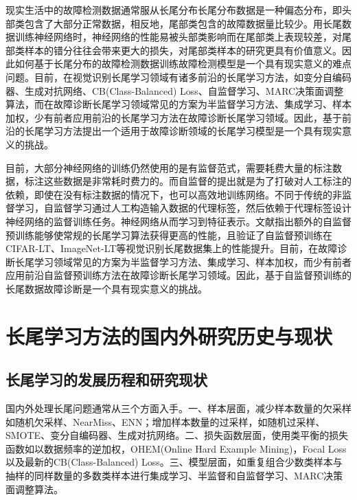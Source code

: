 \documentclass[master]{thesis-uestc}
\begin{document}
现实生活中的故障检测数据通常服从长尾分布长尾分布数据是一种偏态分布，即头部类包含了大部分正常数据，相反地，尾部类包含的故障数据量比较少。用长尾数据训练神经网络时，神经网络的性能易被头部类影响而在尾部类上表现较差，对尾部类样本的错分往往会带来更大的损失，对尾部类样本的研究更具有价值意义。因此如何基于长尾分布的故障检测数据训练故障检测模型是一个具有现实意义的难点问题。目前，在视觉识别长尾学习领域有诸多前沿的长尾学习方法，如变分自编码器、生成对抗网络、CB(Class-Balanced) Loss、自监督学习、MARC决策面调整算法，而在故障诊断长尾学习领域常见的方案为半监督学习方法、集成学习、样本加权，少有前者应用前沿的长尾学习方法在故障诊断长尾学习领域。因此，基于前沿的长尾学习方法提出一个适用于故障诊断领域的长尾学习模型是一个具有现实意义的挑战。

目前，大部分神经网络的训练仍然使用的是有监督范式，需要耗费大量的标注数据，标注这些数据是非常耗时费力的。而自监督的提出就是为了打破对人工标注的依赖，即使在没有标注数据的情况下，也可以高效地训练网络。不同于传统的非监督学习，自监督学习通过人工构造输入数据的代理标签，然后依赖于代理标签设计神经网络的监督训练任务。神经网络从而学习到特征表示。文献\cite{zhang2021federated}指出额外的自监督预训练能够使常规的长尾学习算法获得更高的性能，且验证了自监督预训练在CIFAR-LT、ImageNet-LT等视觉识别长尾数据集上的性能提升。目前，在故障诊断长尾学习领域常见的方案为半监督学习方法、集成学习、样本加权，而少有前者应用前沿自监督预训练方法在故障诊断长尾学习领域。因此，基于自监督预训练的长尾数据故障诊断是一个具有现实意义的挑战。

\section{长尾学习方法的国内外研究历史与现状}
\subsection{长尾学习的发展历程和研究现状}
国内外处理长尾问题通常从三个方面入手。一、样本层面，减少样本数量的欠采样如随机欠采样、NearMiss、ENN；增加样本数量的过采样，如随机过采样、SMOTE、变分自编码器、生成对抗网络。二、损失函数层面，使用类平衡的损失函数如以数据频率的逆加权，OHEM(Online Hard Example Mining)，Focal Loss以及最新的CB(Class-Balanced) Loss。三、模型层面，如重复组合少数类样本与抽样的同样数量的多数类样本进行集成学习、半监督和自监督学习、MARC决策面调整算法。
\end{document}
